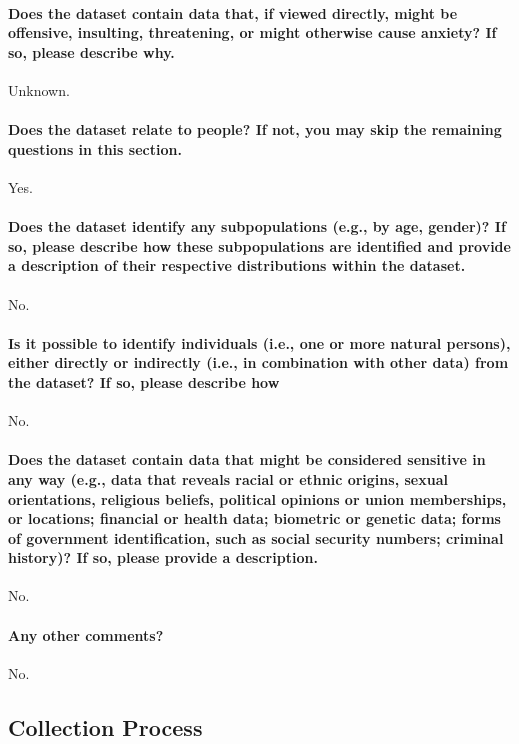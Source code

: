 \paragraph{Does the dataset contain data that, if viewed directly, might be offensive, insulting, threatening, or might otherwise cause anxiety? If so, please describe why.}
Unknown.

\paragraph{Does the dataset relate to people? If not, you may skip the remaining
questions in this section.}
Yes.

\paragraph{Does the dataset identify any subpopulations (e.g., by age, gender)? If so, please describe how these subpopulations are identified and
provide a description of their respective distributions within the dataset.}
No.

\paragraph{Is it possible to identify individuals (i.e., one or more natural persons), either directly or indirectly (i.e., in combination with other
data) from the dataset? If so, please describe how}
No.

\paragraph{Does the dataset contain data that might be considered sensitive
in any way (e.g., data that reveals racial or ethnic origins, sexual
orientations, religious beliefs, political opinions or union memberships, or locations; financial or health data; biometric or genetic data; forms of government identification, such as social security numbers; criminal history)? If so, please provide a description.}
No.

\paragraph{Any other comments?}
No.

\subsection{Collection Process}

